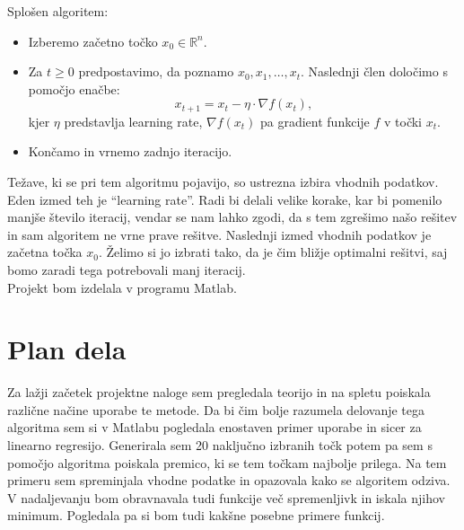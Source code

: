 \documentclass{article}
\begin{document}
Splošen algoritem:
\begin{itemize}
\item{Izberemo začetno točko $x_0 \in \mathbb{R}^n $. }
\item{Za $t \geq 0$ predpostavimo, da poznamo $x_0,x_1, \ldots ,x_t $. Naslednji člen določimo s pomočjo enačbe: 
\[ x_{t+1}=x_t - \eta \cdot \nabla f(x_t), \] 
kjer $ \eta$ predstavlja learning rate, $\nabla f(x_t) $ pa gradient funkcije $f$ v točki $x_t$.}
\item{Končamo in vrnemo zadnjo iteracijo.}
\end{itemize}

Težave, ki se pri tem algoritmu pojavijo, so ustrezna izbira vhodnih podatkov. Eden izmed teh je ``learning rate''. Radi bi delali velike korake, kar bi pomenilo manjše število iteracij, vendar se nam lahko zgodi, da s tem zgrešimo našo rešitev in sam algoritem ne vrne prave rešitve. Naslednji izmed vhodnih podatkov je začetna točka $x_0$. Želimo si jo izbrati tako, da je čim bližje optimalni rešitvi, saj bomo zaradi tega potrebovali manj iteracij.\\

Projekt bom izdelala v programu Matlab.

\section{Plan dela}
Za lažji začetek projektne naloge sem pregledala teorijo in na spletu poiskala različne načine uporabe te metode. Da bi čim bolje razumela delovanje tega algoritma sem si v Matlabu pogledala enostaven primer uporabe in sicer za linearno regresijo. Generirala sem 20 naključno izbranih točk potem pa sem s pomočjo algoritma poiskala premico, ki se tem točkam najbolje prilega. Na tem primeru sem spreminjala vhodne podatke in opazovala kako se algoritem odziva.\\

V nadaljevanju bom obravnavala tudi funkcije več spremenljivk in iskala njihov minimum. Pogledala pa si bom tudi kakšne posebne primere funkcij.
\end{document}
